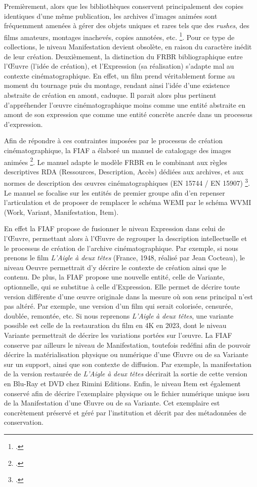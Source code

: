 Premièrement, alors que les bibliothèques conservent principalement des copies identiques d’une même publication, les archives d’images animées sont fréquemment amenées à gérer des objets uniques et rares tels que des \textit{rushes}, des films amateurs, montages inachevés, copies annotées, etc. \footcite{zotero-item-646}. Pour ce type de collections, le niveau Manifestation devient obsolète, en raison du caractère inédit de leur création. Deuxièmement, la distinction du FRBR bibliographique entre l’Œuvre (l’idée de création), et l’Expression (sa réalisation) s’adapte mal au contexte cinématographique. En effet, un film prend véritablement forme au moment du tournage puis du montage, rendant ainsi l’idée d’une existence abstraite de création en amont, caduque. Il parait alors plus pertinent d’appréhender l’œuvre cinématographique moins comme une entité abstraite en amont de son expression que comme une entité concrète ancrée dans un processus d’expression.  

Afin de répondre à ces contraintes imposées par le processus de création cinématographique, la FIAF a élaboré un manuel de catalogage des images animées \footcite{zotero-item-644}. Le manuel adapte le modèle FRBR en le combinant aux règles descriptives RDA (Ressources, Description, Accès) dédiées aux archives, et aux normes de description des œuvres cinématographiques (EN 15744 / EN 15907) \footcite{zotero-item-646}. Le manuel se focalise sur les entités de premier groupe afin d’en repenser l’articulation et de proposer de remplacer le schéma WEMI par le schéma WVMI (Work, Variant, Manifestation, Item).  

En effet la FIAF propose de fusionner le niveau Expression dans celui de l'Œuvre, permettant alors à l’Œuvre de regrouper la description intellectuelle et le processus de création de l’archive cinématographique. Par exemple, si nous prenons le film \textit{L'Aigle à deux têtes} (France, 1948, réalisé par Jean Cocteau), le niveau Oeuvre permettrait d’y décrire le contexte de création ainsi que le contenu. De plus, la FIAF propose une nouvelle entité, celle de Variante, optionnelle, qui se substitue à celle d’Expression. Elle permet de décrire toute version différente d’une œuvre originale dans la mesure où son sens principal n’est pas altéré. Par exemple, une version d’un film qui serait colorisée, censurée, doublée, remontée, etc. Si nous reprenons \textit{L'Aigle à deux têtes}, une variante possible est celle de la restauration du film en 4K en 2023, dont le niveau Variante permettrait de décrire les variations portées sur l’œuvre. La FIAF conserve par ailleurs le niveau de Manifestation, toutefois redéfini afin de pouvoir décrire la matérialisation physique ou numérique d’une Œuvre ou de sa Variante sur un support, ainsi que son contexte de diffusion. Par exemple, la manifestation de la version restaurée de \textit{L'Aigle à deux têtes} décrirait la sortie de cette version en Blu-Ray et DVD chez Rimini Editions. Enfin, le niveau Item est également conservé afin de décrire l’exemplaire physique ou le fichier numérique unique issu de la Manifestation d’une Œuvre ou de sa Variante. Cet exemplaire est concrètement préservé et géré par l’institution et décrit par des métadonnées de conservation.  
		
